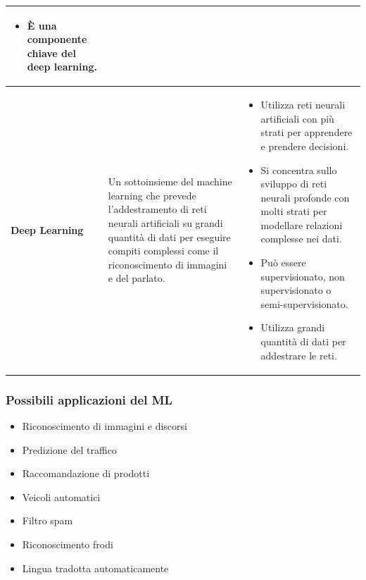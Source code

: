 \documentclass[../main.tex]{subfiles}
\begin{document}
\begin{tabular}{|p{2cm}|p{6cm}|p{7cm}|}
\begin{itemize}
			\item È una componente chiave del deep learning.
		\end{itemize}
		\\
		\hline
		\textbf{Deep Learning} &
		Un sottoinsieme del machine learning che prevede l'addestramento di reti neurali artificiali su grandi quantità di dati per eseguire compiti complessi come il riconoscimento di immagini e del parlato. &
		\begin{itemize}
			\item Utilizza reti neurali artificiali con più strati per apprendere e prendere decisioni.
			\item Si concentra sullo sviluppo di reti neurali profonde con molti strati per modellare relazioni complesse nei dati.
			\item Può essere supervisionato, non supervisionato o semi-supervisionato.
			\item Utilizza grandi quantità di dati per addestrare le reti.
		\end{itemize}
		\\
		\hline
	\end{tabular}
	\subsubsection{Possibili applicazioni del ML}
	\begin{itemize}
		\item Riconoscimento di immagini e discorsi
		\item Predizione del traffico
		\item Raccomandazione di prodotti
		\item Veicoli automatici
		\item Filtro spam
		\item Riconoscimento frodi
		\item Lingua tradotta automaticamente
	\end{itemize}
\end{document}
